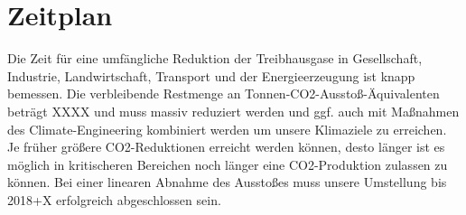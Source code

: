 \section{Zeitplan}

Die Zeit für eine umfängliche Reduktion der Treibhausgase in Gesellschaft, Industrie, Landwirtschaft, Transport und der Energieerzeugung ist knapp bemessen.
Die verbleibende Restmenge an Tonnen-CO2-Ausstoß-Äquivalenten beträgt XXXX und muss massiv reduziert werden und ggf. auch mit Maßnahmen des Climate-Engineering kombiniert werden um unsere Klimaziele zu erreichen.
Je früher größere CO2-Reduktionen erreicht werden können, desto länger ist es möglich in kritischeren Bereichen noch länger eine CO2-Produktion zulassen zu können.
Bei einer linearen Abnahme des Ausstoßes muss unsere Umstellung bis 2018+X erfolgreich abgeschlossen sein.



